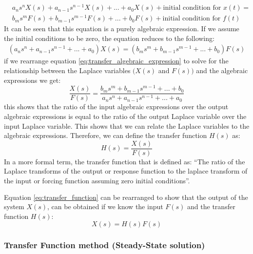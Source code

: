 \documentclass[12pt,letter]{article}
\numberwithin{ex}{section} %
\numberwithin{re}{section} %
\begin{document}
\begin{eqnarray}
&a_ns^nX(s) + a_{n-1}s^{n-1}X(s) + ... + a_0X(s) + \text{initial condition for } x(t) =   \\
&b_ms^mF(s) + b_{m-1}s^{m-1}F(s) + ... + b_0F(s) + \text{initial condition for } f(t)  \nonumber
\end{eqnarray}
It can be seen that this equation is a purely algebraic expression. If we assume the initial conditions to be zero, the equation reduces to the following:
\begin{eqnarray}
(a_ns^n + a_{n-1}s^{n-1} + ... + a_0)X(s) =  (b_ms^m + b_{m-1}s^{m-1} + ... + b_0)F(s) 
\label{eq:transfer_algebraic_expression}
\end{eqnarray}
if we rearrange equation \ref{eq:transfer_algebraic_expression} to solve for the relationship between the Laplace variables $\big( X(s)$ and $F(s) \big)$ and the algebraic expressions we get:
\begin{equation}
\frac{X(s)}{F(s)} = \frac{b_ms^m + b_{m-1}s^{m-1} + ... + b_0}{a_ns^n + a_{n-1}s^{n-1} + ... + a_0}
\end{equation}
this shows that the ratio of the input algebraic expressions over the output algebraic expressions is equal to the ratio of the output Laplace variable over the input Laplace variable. This shows that we can relate the Laplace variables to the algebraic expressions. Therefore, we can define the transfer function $H(s)$ as: 
\begin{equation}
H(s) = \frac{X(s)}{F(s)}
\label{eq:transfer_function}
\end{equation}
In a more formal term, the transfer function that is defined as: ``The ratio of the Laplace transforms of the output or response function to the laplace transform of the input or forcing function assuming zero initial conditions''.

Equation \ref{eq:transfer_function} can be rearranged to show that the output of the system $X(s)$, can be obtained if we know the input $F(s)$ and the transfer function $H(s)$:
\begin{equation}
X(s) = H(s)F(s)
\end{equation}	


\subsubsection{Transfer Function method (Steady-State solution)}
\end{document}
